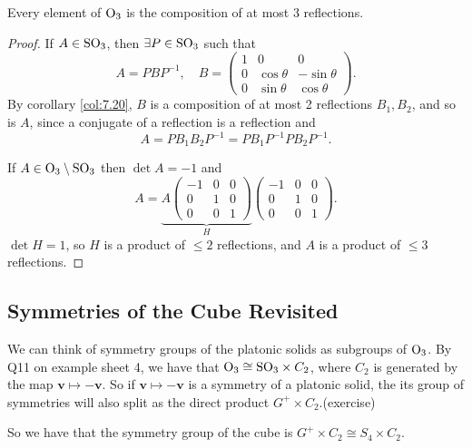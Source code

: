 \documentclass[a4paper]{article}
\begin{document}
    \begin{corollary}\label{col:7.23}
        Every element of $\mathrm{O}_3$ is the composition of at most 3 reflections.
    \end{corollary}
    \begin{proof}
        If $A\in \mathrm{SO}_3$, then $ \exists P\in \mathrm{SO}_3 $ such that 
        \[
            A=PBP^{-1}, \quad B=\begin{pmatrix}
                1&0&0\\
                0&\cos \theta& -\sin \theta\\
                0&\sin \theta& \cos \theta
            \end{pmatrix}.
        \]
        By corollary \ref{col:7.20}, $B$ is a composition of at most 2 reflections $B_1,B_2$, and so is $A$, since a conjugate of a reflection is a reflection and 
        \[
            A=PB_1B_2P^{-1} = PB_1P^{-1}PB_2P^{-1}.
        \]

        If $ A\in \mathrm{O}_3 \setminus \mathrm{SO}_3 $ then $ \det A=-1 $ and 
        \[
            A=\underbrace{A\begin{pmatrix}
                -1&0&0\\
                0&1&0\\
                0&0&1
            \end{pmatrix}}_{H}\begin{pmatrix}
                -1&0&0\\
                0&1&0\\
                0&0&1
            \end{pmatrix}.
        \]
        $ \det H=1 $, so $H$ is a product of $\le 2$ reflections, and $A$ is a product of $\le 3$ reflections.

    \end{proof}
    \subsection{Symmetries of the Cube Revisited}
    We can think of symmetry groups of the platonic solids as subgroups of $\mathrm{O}_3$. By Q11 on example sheet 4, we have that $ \mathrm{O}_3 \cong \mathrm{SO}_3 \times C_2 $, where $C_2$ is generated by the map $ \mathbf{v} \mapsto -\mathbf{v} $. So if $ \mathbf{v} \mapsto -\mathbf{v} $ is a symmetry of a platonic solid, the its group of symmetries will also split as the direct product $ G^+ \times C_2 $.(exercise)
    
    So we have that the symmetry group of the cube is $ G^+\times C_2 \cong S_4 \times C_2 $.
\end{document}
